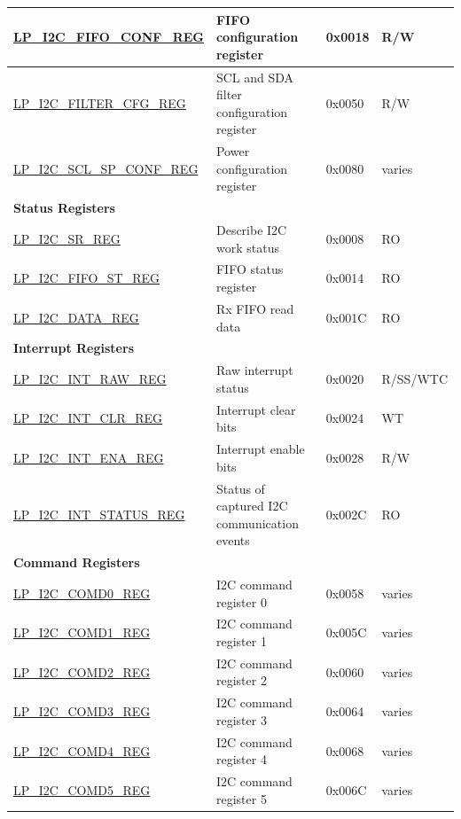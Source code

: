 \begin{longtable}{ | p{6cm} | p{7.2cm} | p{1.3cm} | p{1cm} | }
\hyperref[regdesc:LPI2CFIFOCONFREG]{LP\_I2C\_FIFO\_CONF\_REG} & FIFO configuration register & 0x0018 & R/W \\ \hline
\hyperref[regdesc:LPI2CFILTERCFGREG]{LP\_I2C\_FILTER\_CFG\_REG} & SCL and SDA filter configuration register & 0x0050 & R/W \\ \hline
\hyperref[regdesc:LPI2CSCLSPCONFREG]{LP\_I2C\_SCL\_SP\_CONF\_REG} & Power configuration register & 0x0080 & varies \\ \hline
\multicolumn{4}{|l|}{\textbf{Status Registers}} \\ \hline
\hyperref[regdesc:LPI2CSRREG]{LP\_I2C\_SR\_REG} & Describe I2C work status & 0x0008 & RO \\ \hline
\hyperref[regdesc:LPI2CFIFOSTREG]{LP\_I2C\_FIFO\_ST\_REG} & FIFO status register & 0x0014 & RO \\ \hline
\hyperref[regdesc:LPI2CDATAREG]{LP\_I2C\_DATA\_REG} & Rx FIFO read data & 0x001C & RO \\ \hline
\multicolumn{4}{|l|}{\textbf{Interrupt Registers}} \\ \hline
\hyperref[regdesc:LPI2CINTRAWREG]{LP\_I2C\_INT\_RAW\_REG} & Raw interrupt status & 0x0020 & R/SS/WTC \\ \hline
\hyperref[regdesc:LPI2CINTCLRREG]{LP\_I2C\_INT\_CLR\_REG} & Interrupt clear bits & 0x0024 & WT \\ \hline
\hyperref[regdesc:LPI2CINTENAREG]{LP\_I2C\_INT\_ENA\_REG} & Interrupt enable bits & 0x0028 & R/W \\ \hline
\hyperref[regdesc:LPI2CINTSTATUSREG]{LP\_I2C\_INT\_STATUS\_REG} & Status of captured I2C communication events & 0x002C & RO \\ \hline
\multicolumn{4}{|l|}{\textbf{Command Registers}} \\ \hline
\hyperref[regdesc:LPI2CCOMD0REG]{LP\_I2C\_COMD0\_REG} & I2C command register 0 & 0x0058 & varies \\ \hline
\hyperref[regdesc:LPI2CCOMD1REG]{LP\_I2C\_COMD1\_REG} & I2C command register 1 & 0x005C & varies \\ \hline
\hyperref[regdesc:LPI2CCOMD2REG]{LP\_I2C\_COMD2\_REG} & I2C command register 2 & 0x0060 & varies \\ \hline
\hyperref[regdesc:LPI2CCOMD3REG]{LP\_I2C\_COMD3\_REG} & I2C command register 3 & 0x0064 & varies \\ \hline
\hyperref[regdesc:LPI2CCOMD4REG]{LP\_I2C\_COMD4\_REG} & I2C command register 4 & 0x0068 & varies \\ \hline
\hyperref[regdesc:LPI2CCOMD5REG]{LP\_I2C\_COMD5\_REG} & I2C command register 5 & 0x006C & varies \\ \hline

\end{longtable}
